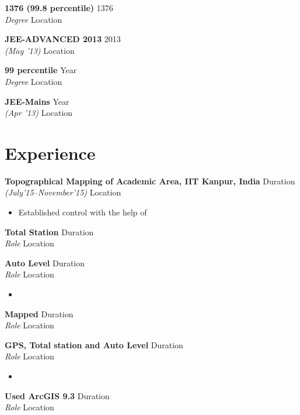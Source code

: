 \documentclass[11pt,a4paper]{article}
\begin{document}
\noindent \textbf{1376 (99.8 percentile)} \hfill 1376 \\
\textit{Degree} \hfill Location



\noindent \textbf{JEE-ADVANCED 2013} \hfill 2013 \\
\textit{(May '13)} \hfill Location



\noindent \textbf{99 percentile} \hfill Year \\
\textit{Degree} \hfill Location



\noindent \textbf{JEE-Mains} \hfill Year \\
\textit{(Apr '13)} \hfill Location



\section*{Experience}

\noindent \textbf{Topographical Mapping of Academic Area, IIT Kanpur, India} \hfill Duration \\
\textit{(July'15--November'15)} \hfill Location
\begin{itemize}
  \item Established control with the help of
\end{itemize}


\noindent \textbf{Total Station} \hfill Duration \\
\textit{Role} \hfill Location



\noindent \textbf{Auto Level} \hfill Duration \\
\textit{Role} \hfill Location
\begin{itemize}
  \item 
\end{itemize}


\noindent \textbf{Mapped} \hfill Duration \\
\textit{Role} \hfill Location



\noindent \textbf{GPS, Total station and Auto Level} \hfill Duration \\
\textit{Role} \hfill Location
\begin{itemize}
  \item 
\end{itemize}


\noindent \textbf{Used ArcGIS 9.3} \hfill Duration \\
\textit{Role} \hfill Location
\end{document}
